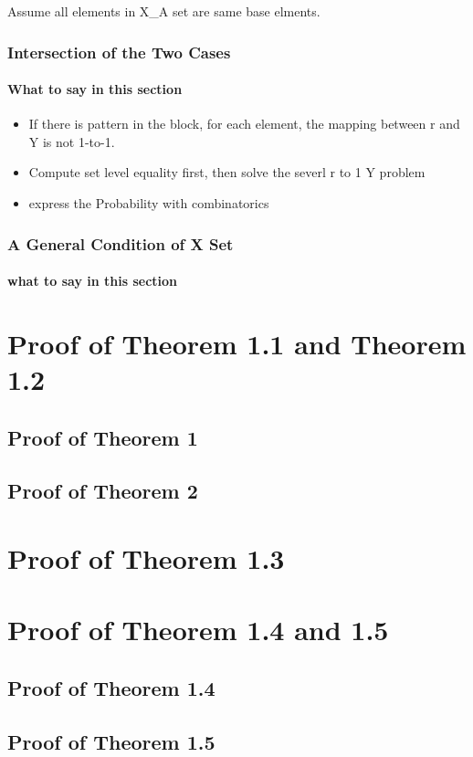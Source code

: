 \documentclass{article}
\begin{document}
Assume all elements in X\_A set are same base elments. 



\subsubsection{Intersection of the Two Cases}
\paragraph{What to say in this section}
\begin{itemize}
	\item If there is pattern in the block, for each element, the mapping between r and Y is not 1-to-1.
	\item Compute set level equality first, then solve the severl r to 1 Y problem
	\item express the Probability with combinatorics
\end{itemize}
\subsubsection{A General Condition of X Set}
\paragraph{what to say in this section}
\appendix
\section{Proof of Theorem 1.1 and Theorem 1.2}
\subsection{Proof of Theorem 1}
\subsection{Proof of Theorem 2}
\section{Proof of Theorem 1.3}
\section{Proof of Theorem 1.4 and 1.5}
\subsection{Proof of Theorem 1.4}
\subsection{Proof of Theorem 1.5}
\end{document}
